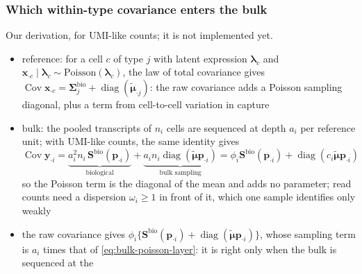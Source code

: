 
\subsubsection{Which within-type covariance enters the bulk}
\label{app:which-covariance}

Our derivation, for UMI-like counts; it is not implemented yet.

\begin{itemize}
  \item reference: for a cell \(c\) of type \(j\) with latent expression \(\boldsymbol{\lambda}_{c}\) and
        \(\boldsymbol{x}_{\cdot c}\mid\boldsymbol{\lambda}_{c}\sim\mathrm{Poisson}(\boldsymbol{\lambda}_{c})\), the law of total covariance gives
        \(\operatorname{Cov}\boldsymbol{x}_{\cdot c}=\boldsymbol{\Sigma}^{\mathrm{bio}}_{j}+\operatorname{diag}(\tilde{\boldsymbol{\mu}}_{\cdot j})\): the raw covariance
        adds a Poisson sampling diagonal, plus a term from cell-to-cell variation in capture
        \cite{sarkarSeparatingMeasurementExpression2021}
  \item bulk: the pooled transcripts of \(n_{i}\) cells are sequenced at depth \(a_{i}\) per reference unit; with UMI-like
        counts, the same identity gives
        \begin{equation}
          \operatorname{Cov}\boldsymbol{y}_{\cdot i}
          =\underbrace{a_{i}^{2}n_{i}\,\boldsymbol{S}^{\mathrm{bio}}(\boldsymbol{p}_{\cdot i})}_{\text{biological}}
          +\underbrace{a_{i}n_{i}\operatorname{diag}(\tilde{\boldsymbol{\mu}}\boldsymbol{p}_{\cdot i})}_{\text{bulk sampling}}
          =\phi_{i}\boldsymbol{S}^{\mathrm{bio}}(\boldsymbol{p}_{\cdot i})+\operatorname{diag}(c_{i}\tilde{\boldsymbol{\mu}}\boldsymbol{p}_{\cdot i})
          \label{eq:bulk-poisson-layer}
        \end{equation}
        so the Poisson term is the diagonal of the mean and adds no parameter; read counts need a dispersion
        \(\omega_{i}\ge1\) in front of it, which one sample identifies only weakly
  \item the raw covariance gives \(\phi_{i}\{\boldsymbol{S}^{\mathrm{bio}}(\boldsymbol{p}_{\cdot i})+\operatorname{diag}(\tilde{\boldsymbol{\mu}}\boldsymbol{p}_{\cdot i})\}\), whose sampling
        term is \(a_{i}\) times that of \eqref{eq:bulk-poisson-layer}: it is right only when the bulk is sequenced at the

\end{itemize}
